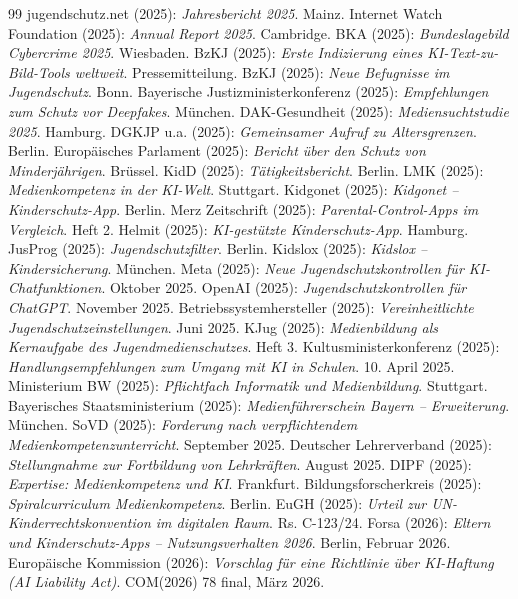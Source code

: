 \documentclass[12pt,a4paper]{article}
\begin{document}
\begin{thebibliography}{99}
		 jugendschutz.net (2025): \emph{Jahresbericht 2025}. Mainz.
		 Internet Watch Foundation (2025): \emph{Annual Report 2025}. Cambridge.
		 BKA (2025): \emph{Bundeslagebild Cybercrime 2025}. Wiesbaden.
		 BzKJ (2025): \emph{Erste Indizierung eines KI-Text-zu-Bild-Tools weltweit}. Pressemitteilung.
		 BzKJ (2025): \emph{Neue Befugnisse im Jugendschutz}. Bonn.
		 Bayerische Justizministerkonferenz (2025): \emph{Empfehlungen zum Schutz vor Deepfakes}. München.
		 DAK-Gesundheit (2025): \emph{Mediensuchtstudie 2025}. Hamburg.
		 DGKJP u.a. (2025): \emph{Gemeinsamer Aufruf zu Altersgrenzen}. Berlin.
		 Europäisches Parlament (2025): \emph{Bericht über den Schutz von Minderjährigen}. Brüssel.
		 KidD (2025): \emph{Tätigkeitsbericht}. Berlin.
		 LMK (2025): \emph{Medienkompetenz in der KI-Welt}. Stuttgart.
		 Kidgonet (2025): \emph{Kidgonet – Kinderschutz-App}. Berlin.
		 Merz Zeitschrift (2025): \emph{Parental-Control-Apps im Vergleich}. Heft 2.
		 Helmit (2025): \emph{KI-gestützte Kinderschutz-App}. Hamburg.
		 JusProg (2025): \emph{Jugendschutzfilter}. Berlin.
		 Kidslox (2025): \emph{Kidslox – Kindersicherung}. München.
		 Meta (2025): \emph{Neue Jugendschutzkontrollen für KI-Chatfunktionen}. Oktober 2025.
		 OpenAI (2025): \emph{Jugendschutzkontrollen für ChatGPT}. November 2025.
		 Betriebssystemhersteller (2025): \emph{Vereinheitlichte Jugendschutzeinstellungen}. Juni 2025.
		 KJug (2025): \emph{Medienbildung als Kernaufgabe des Jugendmedienschutzes}. Heft 3.
		 Kultusministerkonferenz (2025): \emph{Handlungsempfehlungen zum Umgang mit KI in Schulen}. 10. April 2025.
		 Ministerium BW (2025): \emph{Pflichtfach Informatik und Medienbildung}. Stuttgart.
		 Bayerisches Staatsministerium (2025): \emph{Medienführerschein Bayern – Erweiterung}. München.
		 SoVD (2025): \emph{Forderung nach verpflichtendem Medienkompetenzunterricht}. September 2025.
		 Deutscher Lehrerverband (2025): \emph{Stellungnahme zur Fortbildung von Lehrkräften}. August 2025.
		 DIPF (2025): \emph{Expertise: Medienkompetenz und KI}. Frankfurt.
		 Bildungsforscherkreis (2025): \emph{Spiralcurriculum Medienkompetenz}. Berlin.
		 EuGH (2025): \emph{Urteil zur UN-Kinderrechtskonvention im digitalen Raum}. Rs. C-123/24.
		 Forsa (2026): \emph{Eltern und Kinderschutz-Apps – Nutzungsverhalten 2026}. Berlin, Februar 2026.
		 Europäische Kommission (2026): \emph{Vorschlag für eine Richtlinie über KI-Haftung (AI Liability Act)}. COM(2026) 78 final, März 2026.
		

\end{thebibliography}
\end{document}
